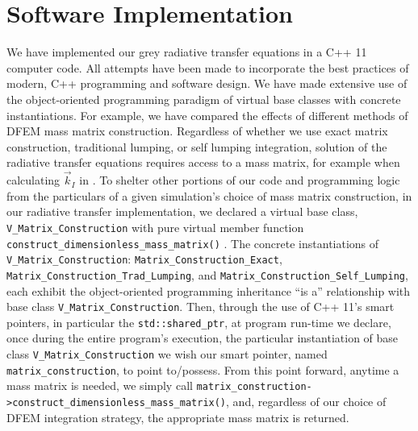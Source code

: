 \section{Software Implementation}
\label{sec:chap6_programming}

We have implemented our grey radiative transfer equations in a C++ 11 computer code.
All attempts have been made to incorporate the best practices of modern, C++ programming and software design\cite{cpp_book,effective_cpp}.
We have made extensive use of the object-oriented programming paradigm of virtual base classes with concrete instantiations.
For example, we have compared the effects of different methods of DFEM mass matrix construction.
Regardless of whether we use exact matrix construction, traditional lumping, or self lumping integration, solution of the radiative transfer equations requires access to a mass matrix, for example when calculating $\vec{k}_I$ in .
To shelter other portions of our code and programming logic from the particulars of a given simulation's choice of mass matrix construction, in our radiative transfer implementation, we declared a virtual base class, \verb+V_Matrix_Construction+ with pure virtual member function \verb+construct_dimensionless_mass_matrix()+ .
The concrete instantiations of \verb+V_Matrix_Construction+: \verb+Matrix_Construction_Exact+, \verb+Matrix_Construction_Trad_Lumping+, and \verb+Matrix_Construction_Self_Lumping+, each exhibit the object-oriented programming inheritance ``is a'' relationship with base class \verb+V_Matrix_Construction+.
Then, through the use of C++ 11's smart pointers, in particular the \verb+std::shared_ptr+,  at program run-time we declare, once during the entire program's execution, the particular instantiation of base class \verb+V_Matrix_Construction+  we wish our smart pointer, named \verb+matrix_construction+, to point to/possess.
From this point forward, anytime a mass matrix is needed, we simply call \verb+matrix_construction->construct_dimensionless_mass_matrix()+, and, regardless of our choice of DFEM integration strategy, the appropriate mass matrix is returned.

